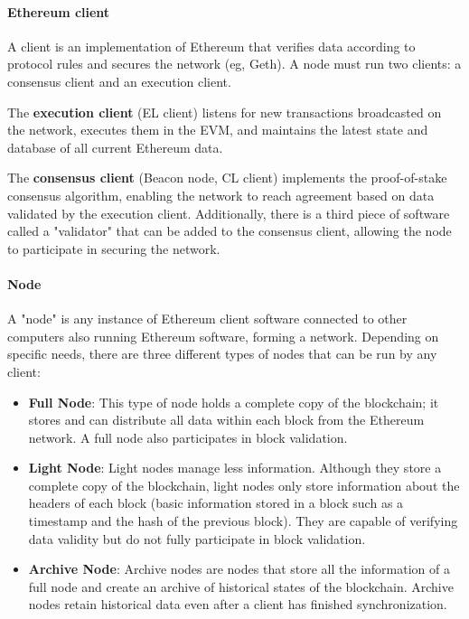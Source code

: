 \paragraph{Ethereum client} A client is an implementation of Ethereum that verifies data according to protocol rules and secures the network (eg, Geth). A node must run two clients: a consensus client and an execution client.

The \textbf{execution client} (EL client) listens for new transactions broadcasted on the network, executes them in the EVM, and maintains the latest state and database of all current Ethereum data.

The \textbf{consensus client} (Beacon node, CL client) implements the proof-of-stake consensus algorithm, enabling the network to reach agreement based on data validated by the execution client. Additionally, there is a third piece of software called a "validator" that can be added to the consensus client, allowing the node to participate in securing the network.





\paragraph{Node}
A "node" is any instance of Ethereum client software connected to other computers also running Ethereum software, forming a network. Depending on specific needs, there are three different types of nodes that can be run by any client:

\begin{itemize}
    \item \textbf{Full Node}: This type of node holds a complete copy of the blockchain; it stores and can distribute all data within each block from the Ethereum network. A full node also participates in block validation.
    \item \textbf{Light Node}: Light nodes manage less information. Although they store a complete copy of the blockchain, light nodes only store information about the headers of each block (basic information stored in a block such as a timestamp and the hash of the previous block). They are capable of verifying data validity but do not fully participate in block validation.
    \item \textbf{Archive Node}: Archive nodes are nodes that store all the information of a full node and create an archive of historical states of the blockchain. Archive nodes retain historical data even after a client has finished synchronization.
\end{itemize}

